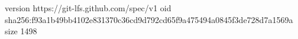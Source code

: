 version https://git-lfs.github.com/spec/v1
oid sha256:f93a1b49bb4102e831370c36cd9d792cd65f9a475494a0845f3de728d7a1569a
size 1498
